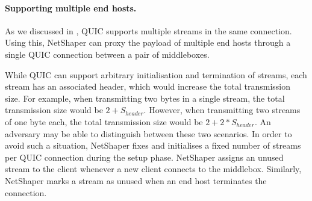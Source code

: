 \paragraph{Supporting multiple end hosts.}
As we discussed in , QUIC supports multiple streams in the same connection.
Using this, NetShaper can proxy the payload of multiple end hosts through a single QUIC connection between a pair of middleboxes.

While QUIC can support arbitrary initialisation and termination of streams, each stream has an associated header, which would increase the total transmission size.
For example, when transmitting two bytes in a single stream, the total transmission size would be $2 + S_{header}$.
However, when transmitting two streams of one byte each, the total transmission size would be $2 + 2*S_{header}$. 
An adversary may be able to distinguish between these two scenarios.
In order to avoid such a situation, NetShaper fixes and initialises a fixed number of streams per QUIC connection during the setup phase.
NetShaper assigns an unused stream to the client whenever a new client connects to the middlebox.
Similarly, NetShaper marks a stream as unused when an end host terminates the connection.

\endinput